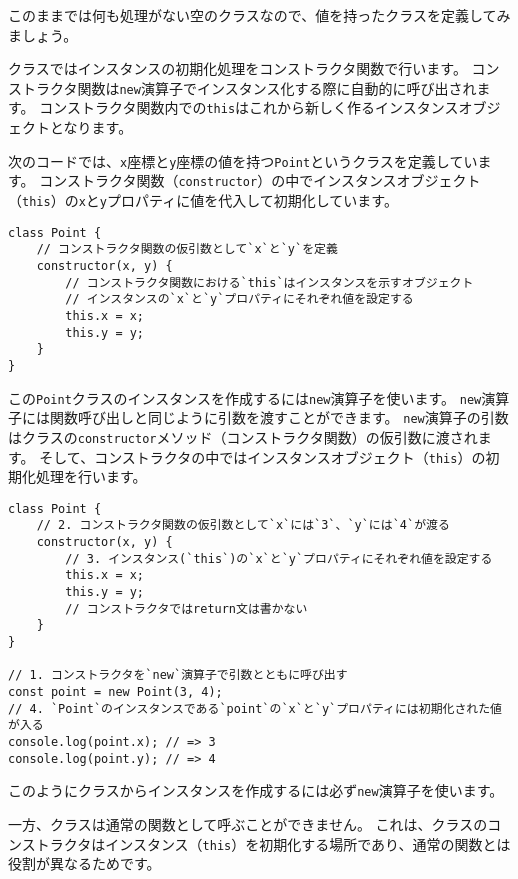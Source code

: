 このままでは何も処理がない空のクラスなので、値を持ったクラスを定義してみましょう。

クラスではインスタンスの初期化処理をコンストラクタ関数で行います。
コンストラクタ関数は\texttt{new}演算子でインスタンス化する際に自動的に呼び出されます。
コンストラクタ関数内での\texttt{this}はこれから新しく作るインスタンスオブジェクトとなります。

次のコードでは、\texttt{x}座標と\texttt{y}座標の値を持つ\texttt{Point}というクラスを定義しています。
コンストラクタ関数（\texttt{constructor}）の中でインスタンスオブジェクト（\texttt{this}）の\texttt{x}と\texttt{y}プロパティに値を代入して初期化しています。

\begin{lstlisting}
class Point {
    // コンストラクタ関数の仮引数として`x`と`y`を定義
    constructor(x, y) {
        // コンストラクタ関数における`this`はインスタンスを示すオブジェクト
        // インスタンスの`x`と`y`プロパティにそれぞれ値を設定する
        this.x = x;
        this.y = y;
    }
}
\end{lstlisting}

この\texttt{Point}クラスのインスタンスを作成するには\texttt{new}演算子を使います。
\texttt{new}演算子には関数呼び出しと同じように引数を渡すことができます。
\texttt{new}演算子の引数はクラスの\texttt{constructor}メソッド（コンストラクタ関数）の仮引数に渡されます。
そして、コンストラクタの中ではインスタンスオブジェクト（\texttt{this}）の初期化処理を行います。

\begin{lstlisting}
class Point {
    // 2. コンストラクタ関数の仮引数として`x`には`3`、`y`には`4`が渡る
    constructor(x, y) {
        // 3. インスタンス(`this`)の`x`と`y`プロパティにそれぞれ値を設定する
        this.x = x;
        this.y = y;
        // コンストラクタではreturn文は書かない
    }
}

// 1. コンストラクタを`new`演算子で引数とともに呼び出す
const point = new Point(3, 4);
// 4. `Point`のインスタンスである`point`の`x`と`y`プロパティには初期化された値が入る
console.log(point.x); // => 3
console.log(point.y); // => 4
\end{lstlisting}

このようにクラスからインスタンスを作成するには必ず\texttt{new}演算子を使います。

一方、クラスは通常の関数として呼ぶことができません。
これは、クラスのコンストラクタはインスタンス（\texttt{this}）を初期化する場所であり、通常の関数とは役割が異なるためです。

